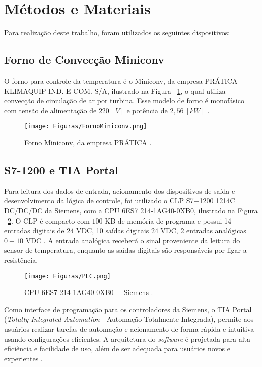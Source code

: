 \section{Métodos e Materiais}
    Para realização deste trabalho, foram utilizados os seguintes dispositivos:
    \subsection{Forno de Convecção Miniconv}
        O forno para controle da temperatura é o Miniconv, da empresa PRÁTICA KLIMAQUIP IND. E COM. S/A, ilustrado na Figura ~\ref{fig:Forno}, o qual utiliza convecção de circulação de ar por turbina. Esse modelo de forno é monofásico com tensão de alimentação de $220 \ [V]$ e potência de $2,56 \ [kW]$ \cite{Manual_Miniconv}.
        \begin{figure}[H]
            \centering
            \texttt{[image: Figuras/FornoMiniconv.png]}
            \caption{Forno Miniconv, da empresa PRÁTICA \cite{Manual_Miniconv}.} \label{fig:Forno}
        \end{figure}
    \subsection{S7-1200 e TIA Portal}
        Para leitura dos dados de entrada, acionamento dos dispositivos de saída e desenvolvimento da lógica de controle, foi utilizado o CLP S7$-$1200 1214C DC/DC/DC da Siemens, com a CPU 6ES7 214-1AG40-0XB0, ilustrado na Figura ~\ref{fig:PLC_Siemens}. O CLP é compacto com $100$ KB de memória de programa e possui 14 entradas digitais de $24$ VDC, 10 saídas digitais $24$ VDC, 2 entradas analógicas $0-10$ VDC \cite{CLP_S7-1200}. A entrada analógica receberá o sinal proveniente da leitura do sensor de temperatura, enquanto as saídas digitais são responsáveis por ligar a resistência.
        \begin{figure}[H]
            \centering
                \texttt{[image: Figuras/PLC.png]}
                \caption{CPU 6ES7 214-1AG40-0XB0 $-$ Siemens \cite{CLP_S7-1200}.} \label{fig:PLC_Siemens}
        \end{figure}
        
        Como interface de programação para os controladores da Siemens, o TIA Portal (\textit{Totally Integrated Automation} - Automação Totalmente Integrada), permite aos usuários realizar tarefas de automação e acionamento de forma rápida e intuitiva usando configurações eficientes. A arquitetura do \textit{software} é projetada para alta eficiência e facilidade de uso, além de ser adequada para usuários novos e experientes \cite{TIA_Portal}.
        
